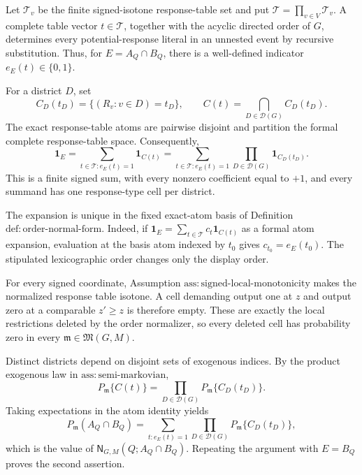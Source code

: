 Let \(\mathcal T_v\) be the finite signed-isotone response-table set and put \(\mathcal T=\prod_{v\in V}\mathcal T_v\).  A complete table vector \(t\in\mathcal T\), together with the acyclic directed order of \(G\), determines every potential-response literal in an unnested event by recursive substitution.  Thus, for \(E=A_Q\cap B_Q\), there is a well-defined indicator \(e_E(t)\in\{0,1\}\).

For a district \(D\), set
\[
 C_D(t_D)=\{(R_v:v\in D)=t_D\},
 \qquad
 C(t)=\bigcap_{D\in\mathcal D(G)}C_D(t_D).
\]
The exact response-table atoms are pairwise disjoint and partition the formal complete response-table space.  Consequently,
\[
 \mathbf 1_E
 =\sum_{t\in\mathcal T:e_E(t)=1}\mathbf 1_{C(t)}
 =\sum_{t\in\mathcal T:e_E(t)=1}
   \prod_{D\in\mathcal D(G)}\mathbf 1_{C_D(t_D)}.
\]
This is a finite signed sum, with every nonzero coefficient equal to \(+1\), and every summand has one response-type cell per district.

The expansion is unique in the fixed exact-atom basis of Definition \(\mathrm{def:order\text{-}normal\text{-}form}\).  Indeed, if \(\mathbf 1_E=\sum_{t\in\mathcal T}c_t\mathbf 1_{C(t)}\) as a formal atom expansion, evaluation at the basis atom indexed by \(t_0\) gives \(c_{t_0}=e_E(t_0)\).  The stipulated lexicographic order changes only the display order.

For every signed coordinate, Assumption \(\mathrm{ass:signed\text{-}local\text{-}monotonicity}\) makes the normalized response table isotone.  A cell demanding output one at \(z\) and output zero at a comparable \(z'\ge z\) is therefore empty.  These are exactly the local restrictions deleted by the order normalizer, so every deleted cell has probability zero in every \(\mathfrak m\in\mathfrak M(G,M)\).

Distinct districts depend on disjoint sets of exogenous indices.  By the product exogenous law in \(\mathrm{ass:semi\text{-}markovian}\),
\[
 P_{\mathfrak m}\{C(t)\}
 =\prod_{D\in\mathcal D(G)}P_{\mathfrak m}\{C_D(t_D)\}.
\]
Taking expectations in the atom identity yields
\[
 P_{\mathfrak m}(A_Q\cap B_Q)
 =\sum_{t:e_E(t)=1}
   \prod_{D\in\mathcal D(G)}P_{\mathfrak m}\{C_D(t_D)\},
\]
which is the value of \(\mathsf N_{G,M}(Q;A_Q\cap B_Q)\).  Repeating the argument with \(E=B_Q\) proves the second assertion.